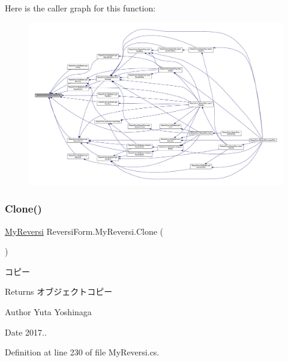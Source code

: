 Here is the caller graph for this function\+:
\nopagebreak
\begin{figure}[H]
\begin{center}
\leavevmode
\includegraphics[width=350pt]{class_reversi_form_1_1_my_reversi_a7d861112d0ddeb404cd3e8d8f5c2756b_icgraph}
\end{center}
\end{figure}
\mbox{\label{class_reversi_form_1_1_my_reversi_aa340f79c0f7bb78750c410ce73ca7b99}} 
\subsubsection{\texorpdfstring{Clone()}{Clone()}}
{\footnotesize\ttfamily \hyperlink{class_reversi_form_1_1_my_reversi}{My\+Reversi} Reversi\+Form.\+My\+Reversi.\+Clone (\begin{DoxyParamCaption}{ }\end{DoxyParamCaption})}



コピー 

\begin{DoxyReturn}{Returns}
オブジェクトコピー 
\end{DoxyReturn}
\begin{DoxyAuthor}{Author}
Yuta Yoshinaga 
\end{DoxyAuthor}
\begin{DoxyDate}{Date}
2017.. 
\end{DoxyDate}


Definition at line 230 of file My\+Reversi.\+cs.

